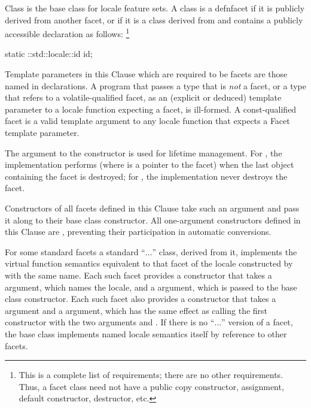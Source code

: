 \pnum
Class  is the base class for locale feature sets.
A class is a defn{facet}
if it is publicly derived from another facet, or
if it is a class derived from  and
contains a publicly accessible declaration as follows:%
\footnote{This is a complete list of requirements; there are no other requirements.
Thus, a facet class need not have a public
copy constructor, assignment, default constructor, destructor, etc.}
\begin{codeblock}
static ::std::locale::id id;
\end{codeblock}

\pnum
Template parameters in this Clause which are required to be facets are those named
in declarations.
A program that passes a type that is
\textit{not}
a facet, or a type that refers to a volatile-qualified facet, as an
(explicit or deduced) template parameter to a locale
function expecting a facet, is ill-formed. A const-qualified facet is a
valid template argument to any locale function that expects a Facet template
parameter.

\pnum
The 
argument to the constructor is used for lifetime management.
For
,
the implementation performs
(where
is a point\-er to the facet) when the last
object containing the facet is destroyed;
for
,
the implementation never destroys the facet.

\pnum
Constructors of all
facets defined in this Clause take such an argument and pass it
along to their
base class constructor.
All one-argument constructors defined
in this Clause are
,
preventing their participation in automatic conversions.

\pnum
For some standard facets a standard
``$\ldots$''
class, derived from it, implements the virtual function semantics
equivalent to that facet of the locale constructed by
with the same name.
Each such facet provides a constructor that takes a
argument, which names the locale, and a 
argument, which is passed to the base class constructor.
Each such facet also provides a constructor that takes a
 argument  and a 
argument, which has the same effect as calling the first constructor with the
two arguments  and .
If there is no
``$\ldots$''
version of a facet, the base class implements named locale
semantics itself by reference to other facets.

